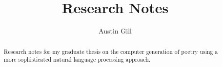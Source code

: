 \documentclass{article}
\title{Research Notes}
\author{Austin Gill}
\begin{document}
\maketitle

\begin{abstract}
    Research notes for my graduate thesis on the computer generation of poetry using a more sophisticated natural language processing approach.
\end{abstract}

\thispagestyle{empty}
\begingroup
\hypersetup{linkcolor=black}
\tableofcontents
\endgroup








\newpage

\nocite{*}



\end{document}
